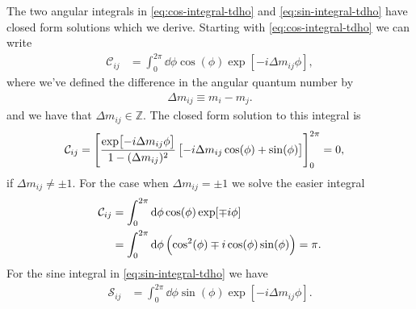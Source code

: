             The two angular integrals in \autoref{eq:cos-integral-tdho} and
            \autoref{eq:sin-integral-tdho} have closed form solutions which we
            derive.
            Starting with \autoref{eq:cos-integral-tdho} we can write
            \begin{align}
                \mathcal{C}_{ij}
                &=
                \int_{0}^{2\pi}
                \dd \phi
                \cos(\phi)
                \exp[-i\Delta m_{ij} \phi],
            \end{align}
            where we've defined the difference in the angular quantum number by
            \begin{align}
                \Delta m_{ij} \equiv m_i - m_j.
                \label{eq:diff-m-tdqd}
            \end{align}
            and we have that $\Delta m_{ij} \in \mathbb{Z}$.
            The closed form solution to this integral is
            \begin{align}
                \mathcal{C}_{ij}
                &= \left[ 
                    \frac{\exp[-i\Delta m_{ij} \phi]}{1 - (\Delta m_{ij})^2}
                    \left[ 
                        -i\Delta m_{ij} \cos(\phi)
                        + \sin(\phi)
                     \right]
                 \right]_{0}^{2\pi}
                = 0,
                \label{eq:dipole-x-tdqd}
            \end{align}
            if $\Delta m_{ij} \neq \pm 1$.
            For the case when $\Delta m_{ij} = \pm 1$ we solve the easier
            integral
            \begin{align}
                \mathcal{C}_{ij}
                &=
                \int_{0}^{2\pi}
                \dd \phi
                \cos(\phi) \exp[\mp i\phi]
                \\
                &=
                \int_{0}^{2\pi}
                \dd \phi
                \left( 
                    \cos^2(\phi)
                    \mp i\cos(\phi)\sin(\phi)
                 \right)
                = \pi.
            \end{align}
            For the sine integral in \autoref{eq:sin-integral-tdho} we have
            \begin{align}
                \mathcal{S}_{ij}
                &=
                \int_{0}^{2\pi}
                \dd\phi
                \sin(\phi)
                \exp[-i\Delta m_{ij} \phi].
                \label{eq:dipole-y-tdqd}
            \end{align}
